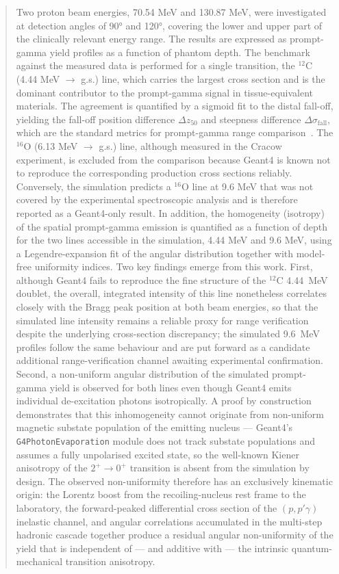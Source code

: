 \documentclass[a4paper]{article}
\begin{document}
\begin{abstract}
Two proton beam energies, 70.54 MeV and 130.87 MeV, were investigated at detection angles of 90° and 120°, covering the lower and upper part of the clinically relevant energy range. The results are expressed as prompt-gamma yield profiles as a function of phantom depth. The benchmark against the measured data is performed for a single transition, the $^{12}$C (4.44 MeV $\to$ g.s.) line, which carries the largest cross section and is the dominant contributor to the prompt-gamma signal in tissue-equivalent materials. The agreement is quantified by a sigmoid fit to the distal fall-off, yielding the fall-off position difference $\Delta z_{50}$ and steepness difference $\Delta\sigma_\mathrm{fall}$, which are the standard metrics for prompt-gamma range comparison~\cite{janssen2014,pinto2015,valencialozano2023}. The $^{16}$O (6.13 MeV $\to$ g.s.) line, although measured in the Cracow experiment, is excluded from the comparison because Geant4 is known not to reproduce the corresponding production cross sections reliably. Conversely, the simulation predicts a $^{16}$O line at 9.6 MeV that was not covered by the experimental spectroscopic analysis and is therefore reported as a Geant4-only result. In addition, the homogeneity (isotropy) of the spatial prompt-gamma emission is quantified as a function of depth for the two lines accessible in the simulation, 4.44 MeV and 9.6 MeV, using a Legendre-expansion fit of the angular distribution together with model-free uniformity indices. Two key findings emerge from this work. First, although Geant4 fails to reproduce the fine structure of the $^{12}$C 4.44~MeV doublet, the overall, integrated intensity of this line nonetheless correlates closely with the Bragg peak position at both beam energies, so that the simulated line intensity remains a reliable proxy for range verification despite the underlying cross-section discrepancy; the simulated 9.6~MeV profiles follow the same behaviour and are put forward as a candidate additional range-verification channel awaiting experimental confirmation. Second, a non-uniform angular distribution of the simulated prompt-gamma yield is observed for both lines even though Geant4 emits individual de-excitation photons isotropically. A proof by construction demonstrates that this inhomogeneity cannot originate from non-uniform magnetic substate population of the emitting nucleus — Geant4's \texttt{G4PhotonEvaporation} module does not track substate populations and assumes a fully unpolarised excited state, so the well-known Kiener anisotropy of the $2^+\to 0^+$ transition is absent from the simulation by design. The observed non-uniformity therefore has an exclusively kinematic origin: the Lorentz boost from the recoiling-nucleus rest frame to the laboratory, the forward-peaked differential cross section of the $(p,p'\gamma)$ inelastic channel, and angular correlations accumulated in the multi-step hadronic cascade together produce a residual angular non-uniformity of the yield that is independent of — and additive with — the intrinsic quantum-mechanical transition anisotropy.

\end{abstract}
\end{document}
